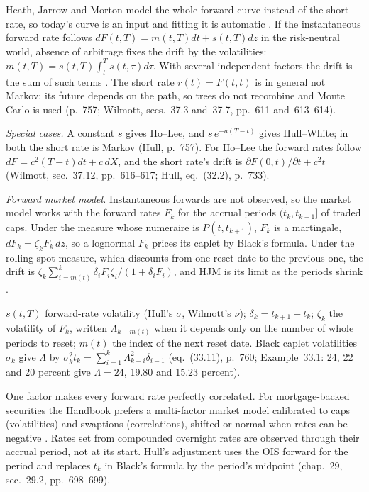 \begin{qfmodel}\label{mod:hjm-forward-rate-models}
 Heath, Jarrow and Morton model the whole forward curve instead of the short rate, so today's curve is an input and fitting it is automatic \citep[chap.~37, sec.~37.1, p.~609]{wide-wilmott-pwoqf}. If the instantaneous forward rate follows $dF(t,T)=m(t,T)dt+s(t,T)dz$ in the risk-neutral world, absence of arbitrage fixes the drift by the volatilities: $m(t,T)=s(t,T)\int_t^Ts(t,\tau)d\tau$. With several independent factors the drift is the sum of such terms \citep[chap.~33, sec.~33.1, pp.~756--758, eqs.~(33.4)--(33.6)]{s7-hulloptions}. The short rate $r(t)=F(t,t)$ is in general not Markov: its future depends on the path, so trees do not recombine and Monte Carlo is used (p.~757; Wilmott, secs.~37.3 and~37.7, pp.~611 and~613--614).

\emph{Special cases.} A constant $s$ gives Ho--Lee, and $s\,e^{-a(T-t)}$ gives Hull--White; in both the short rate is Markov (Hull, p.~757). For Ho--Lee the forward rates follow $dF=c^2(T-t)dt+c\,dX$, and the short rate's drift is $\partial F(0,t)/\partial t+c^2t$ (Wilmott, sec.~37.12, pp.~616--617; Hull, eq.~(32.2), p.~733).

\emph{Forward market model.} Instantaneous forwards are not observed, so the market model works with the forward rates $F_k$ for the accrual periods $(t_k,t_{k+1}]$ of traded caps. Under the measure whose numeraire is $P(t,t_{k+1})$, $F_k$ is a martingale, $dF_k=\zeta_kF_k\,dz$, so a lognormal $F_k$ prices its caplet by Black's formula. Under the rolling spot measure, which discounts from one reset date to the previous one, the drift is $\zeta_k\sum_{i=m(t)}^k\delta_iF_i\zeta_i/(1+\delta_iF_i)$, and HJM is its limit as the periods shrink \citep[chap.~33, sec.~33.2, pp.~758--762, eqs.~(33.7)--(33.14)]{s7-hulloptions}.

 $s(t,T)$ forward-rate volatility (Hull's $\sigma$, Wilmott's $\nu$); $\delta_k=t_{k+1}-t_k$; $\zeta_k$ the volatility of $F_k$, written $\Lambda_{k-m(t)}$ when it depends only on the number of whole periods to reset; $m(t)$ the index of the next reset date. Black caplet volatilities $\sigma_k$ give $\Lambda$ by $\sigma_k^2t_k=\sum_{i=1}^k\Lambda_{k-i}^2\delta_{i-1}$ (eq.~(33.11), p.~760; Example~33.1: 24, 22 and 20 percent give $\Lambda=24$, 19.80 and 15.23 percent).

 One factor makes every forward rate perfectly correlated. For mortgage-backed securities the Handbook prefers a multi-factor market model calibrated to caps (volatilities) and swaptions (correlations), shifted or normal when rates can be negative \citep[chap.~37, pp.~861--863]{s7-fabozzifixed}. Rates set from compounded overnight rates are observed through their accrual period, not at its start. Hull's adjustment uses the OIS forward for the period and replaces $t_k$ in Black's formula by the period's midpoint (chap.~29, sec.~29.2, pp.~698--699).


\end{qfmodel}
